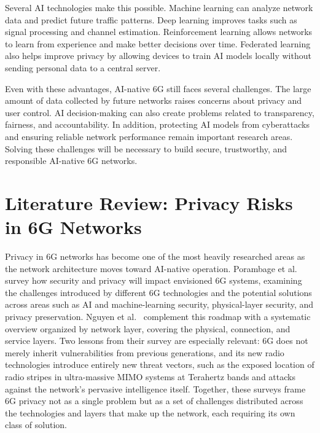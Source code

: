 \documentclass[letterpaper]{article}
\begin{document}
Several AI technologies make this possible. Machine learning can analyze network data and predict future traffic patterns. Deep learning improves tasks such as signal processing and channel estimation. Reinforcement learning allows networks to learn from experience and make better decisions over time. Federated learning also helps improve privacy by allowing devices to train AI models locally without sending personal data to a central server.

Even with these advantages, AI-native 6G still faces several challenges. The large amount of data collected by future networks raises concerns about privacy and user control. AI decision-making can also create problems related to transparency, fairness, and accountability. In addition, protecting AI models from cyberattacks and ensuring reliable network performance remain important research areas. Solving these challenges will be necessary to build secure, trustworthy, and responsible AI-native 6G networks.

\section{Literature Review: Privacy Risks in 6G Networks}
Privacy in 6G networks has become one of the most heavily researched areas as the
network architecture moves toward AI-native operation. Porambage et
al.~\cite{porambage2021} survey how security and privacy will impact envisioned 6G
systems, examining the challenges introduced by different 6G technologies and the
potential solutions across areas such as AI and machine-learning security,
physical-layer security, and privacy preservation. Nguyen et al.~\cite{nguyen2021}
complement this roadmap with a systematic overview organized by network layer,
covering the physical, connection, and service layers. Two lessons from their survey
are especially relevant: 6G does not merely inherit vulnerabilities from previous
generations, and its new radio technologies introduce entirely new threat vectors,
such as the exposed location of radio stripes in ultra-massive MIMO systems at
Terahertz bands and attacks against the network's pervasive intelligence itself.
Together, these surveys frame 6G privacy not as a single problem but as a set of
challenges distributed across the technologies and layers that make up the network,
each requiring its own class of solution.
\end{document}
